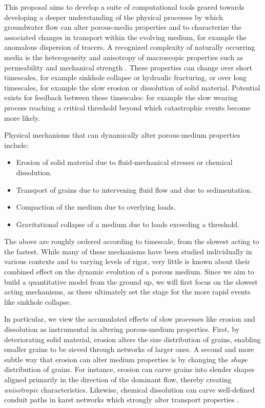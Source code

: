 \documentclass[11pt]{article}
\begin{document}
	This proposal aims to develop a suite of computational tools geared towards developing a deeper understanding of the physical processes by which groundwater flow can alter porous-media properties and to characterize the associated changes in transport within the evolving medium, for example the anomalous dispersion of tracers. A recognized complexity of naturally occurring media is the heterogeneity and anisotropy of macroscopic properties such as permeability and mechanical strength \cite{lin2018randomization}. These properties can change over short timescales, for example sinkhole collapse or hydraulic fracturing, or over long timescales, for example the slow erosion or dissolution of solid material. Potential exists for feedback between these timescales: for example the slow wearing process reaching a critical threshold beyond which catastrophic events become more likely.
	
Physical mechanisms that can dynamically alter porous-medium properties include:
\begin{itemize}
\item Erosion of solid material due to fluid-mechanical stresses or chemical dissolution.
\item Transport of grains due to intervening fluid flow and due to sedimentation.
\item Compaction of the medium due to overlying loads.
\item Gravitational collapse of a medium due to loads exceeding a threshold.
\end{itemize}
The above are roughly ordered according to timescale, from the slowest acting to the fastest. While many of these mechanisms have been studied individually in various contexts and to varying levels of rigor, very little is known about their combined effect on the dynamic evolution of a porous medium. Since we aim to build a quantitative model from the ground up, we will first focus on the slowest acting mechanisms, as these ultimately set the stage for the more rapid events like sinkhole collapse. 

In particular, we view the accumulated effects of slow processes like erosion and dissolution as instrumental in altering porous-medium properties. First, by deteriorating solid material, erosion alters the size distribution of grains, enabling smaller grains to be sieved through networks of larger ones. A second and more subtle way that erosion can alter medium properties is by changing the {\em shape} distribution of grains. For instance, erosion can carve grains into slender shapes aligned primarily in the direction of the dominant flow, thereby creating {\em anisotropic} characteristics. Likewise, chemical dissolution can carve well-defined conduit paths in karst networks which strongly alter transport properties \cite{szymczak2009wormhole}.
\end{document}
